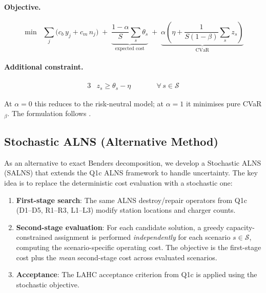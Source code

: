 \documentclass[11pt,a4paper]{article}
\begin{document}
\paragraph{Objective.}
\begin{equation}\label{eq:cvar-obj}
  \min \;\;
  \sum_{j} \bigl(c_b \, y_j + c_m \, n_j\bigr)
  \;+\;
  \underbrace{
    \frac{1-\alpha}{S} \sum_{s} \theta_s
  }_{\text{expected cost}}
  \;+\;
  \underbrace{
    \alpha \left(
      \eta + \frac{1}{S(1-\beta)} \sum_{s} z_s
    \right)
  }_{\text{CVaR}}
\end{equation}

\paragraph{Additional constraint.}
\begin{alignat}{3}
  & z_s \geq \theta_s - \eta
    && \qquad \forall\, s \in \mathcal{S}
    \label{eq:cvar-c} \tag{CV1}
\end{alignat}

\noindent
At $\alpha = 0$ this reduces to the risk-neutral model; at $\alpha = 1$ it minimises pure CVaR$_\beta$.
The formulation follows \citet{rockafellar2000}.


\subsection{Stochastic ALNS (Alternative Method)}
\label{sec:salns}

As an alternative to exact Benders decomposition, we develop a Stochastic ALNS (SALNS) that extends the Q1c ALNS framework to handle uncertainty.
The key idea is to replace the deterministic cost evaluation with a stochastic one:

\begin{enumerate}[nosep]
  \item \textbf{First-stage search}: The same ALNS destroy/repair operators from Q1c (D1--D5, R1--R3, L1--L3) modify station locations and charger counts.
  \item \textbf{Second-stage evaluation}: For each candidate solution, a greedy capacity-constrained assignment is performed \emph{independently} for each scenario $s \in \mathcal{S}$, computing the scenario-specific operating cost. The objective is the first-stage cost plus the \emph{mean} second-stage cost across evaluated scenarios.
  \item \textbf{Acceptance}: The LAHC acceptance criterion from Q1c is applied using the stochastic objective.
\end{enumerate}
\end{document}
